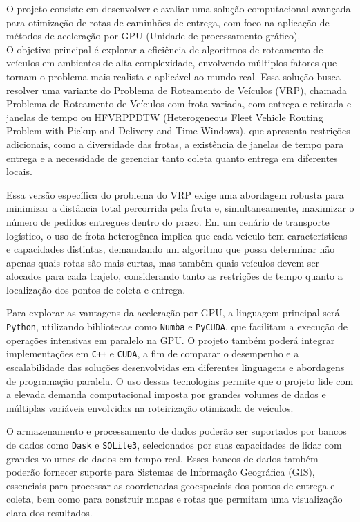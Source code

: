\documentclass[
    openany,
    12pt,
    a4paper,
    twoside,
    english,
    brazil, sumario=tradicional
]{/home/lucas_galdino/Desktop/TCC/planning/abntex2/abntex2}
\begin{document}
O projeto consiste em desenvolver e avaliar uma solução computacional avançada para otimização de rotas de caminhões de entrega, 
com foco na aplicação de métodos de aceleração por GPU (Unidade de processamento gráfico). \\
O objetivo principal é explorar a eficiência de algoritmos de roteamento de veículos em ambientes de alta complexidade, envolvendo múltiplos 
fatores que tornam o problema mais realista e aplicável ao mundo 
real. Essa solução busca resolver uma variante do Problema de Roteamento de Veículos (VRP), chamada Problema de Roteamento de Veículos com frota variada, 
com entrega e retirada e janelas de tempo ou HFVRPPDTW (Heterogeneous Fleet 
Vehicle Routing Problem with Pickup and Delivery and Time Windows), que apresenta restrições adicionais, como a diversidade das frotas, 
a existência de janelas de tempo para entrega e a necessidade de gerenciar tanto coleta quanto entrega em diferentes locais.

Essa versão específica do problema do VRP exige uma abordagem robusta para minimizar a distância total percorrida pela frota 
e, simultaneamente, maximizar o número de pedidos entregues dentro do prazo. Em um cenário de transporte logístico, o uso de 
frota heterogênea implica que cada veículo tem características e capacidades distintas, demandando um algoritmo que possa determinar 
não apenas quais rotas são mais curtas, mas também quais veículos devem ser alocados para cada trajeto, considerando tanto as restrições 
de tempo quanto a localização dos pontos de coleta e entrega.

Para explorar as vantagens da aceleração por GPU, a linguagem principal será \texttt{Python}, utilizando bibliotecas como \texttt{Numba} e 
\texttt{PyCUDA}, que facilitam a execução de operações intensivas em paralelo na GPU. O projeto também poderá integrar implementações em \texttt{C++} 
e \texttt{CUDA}, a fim de comparar o desempenho e a escalabilidade das soluções desenvolvidas em diferentes linguagens e abordagens de programação 
paralela. O uso dessas tecnologias permite que o projeto lide com a elevada demanda computacional imposta por grandes volumes de dados e múltiplas 
variáveis envolvidas na roteirização otimizada de veículos.

O armazenamento e processamento de dados poderão ser suportados por bancos de dados como \texttt{Dask} e \texttt{SQLite3}, selecionados por suas capacidades
de lidar com grandes volumes de dados em tempo real. Esses bancos de dados também poderão fornecer suporte para Sistemas de Informação Geográfica (GIS), 
essenciais para processar as coordenadas geoespaciais dos pontos de entrega e coleta, bem como para construir mapas e rotas que permitam uma visualização 
clara dos resultados.
\end{document}
